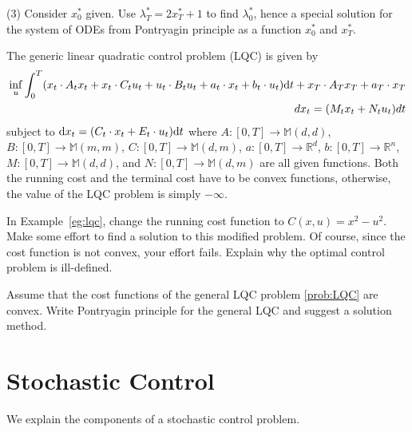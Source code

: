 \documentclass[11pt]{book}
\newcommand{\dt}{\text{\normalfont d}t}
\newcommand{\dx}{\text{\normalfont d}x}
\begin{document}
\begin{ex}
\begin{equation}
    \end{equation}
    (3) Consider $x^*_0$ given. Use $\lambda^*_T= 2x^*_T + 1$ to find $\lambda^*_0$, hence a special solution for the system of ODEs from Pontryagin principle as a function $x^*_0$ and $x^*_T$.  
\end{ex}

The generic linear quadratic control problem (LQC) is given by
\begin{equation}\label{prob:LQC}
\begin{split}
     \inf_{u}\int_0^T(x_t\cdot A_t x_t  + x_t\cdot C_t u_t + u_t\cdot B_t u_t+ a_t\cdot x_t  +b_t\cdot u_t ){{\dt}} + x_T\cdot A_Tx_T + a_T \cdot x_T\\
     dx_t =  (M_t x_t + N_t u_t) dt 
\end{split}
\end{equation}
subject to ${\dx}_t=(C_t\cdot x_t + E_t\cdot u_t){{\dt}}$ where $A:[0,T]\to \mathbb{M}(d,d)$, $B:[0,T]\to \mathbb{M}(m,m)$, $C:[0,T]\to \mathbb{M}(d,m)$, $a:[0,T]\to \mathbb{R}^d$, $b:[0,T]\to \mathbb{R}^n$, $M:[0,T]\to \mathbb{M}(d,d)$, and $N:[0,T]\to \mathbb{M}(d,m)$ are all given functions.
Both the running cost and the terminal cost have to be convex functions, otherwise, the value of the LQC problem is simply $-\infty$. 
\begin{ex}
    In Example~\ref{eg:lqc}, change the running cost function to $C(x,u)= x^2 -  u^2$. Make some effort to find a solution to this modified problem. Of course, since the cost function is not convex, your effort fails. Explain why the optimal control problem is ill-defined.
\end{ex}
\begin{ex}
Assume that the cost functions of the general LQC problem \eqref{prob:LQC} are convex.
    Write Pontryagin principle for the general LQC and suggest a solution method. 
\end{ex}


\chapter{Stochastic Control}
We explain the components of a stochastic control problem.
\end{document}
